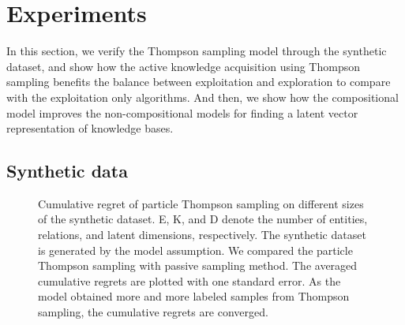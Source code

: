 \section{Experiments}
In this section, we verify the Thompson sampling model through the synthetic dataset, and show how 
the active knowledge acquisition using Thompson sampling benefits the balance between exploitation and exploration
 to compare with the exploitation only algorithms. And then, we show how the compositional model
improves the non-compositional models for finding a latent vector representation of knowledge bases.

\subsection{Synthetic data}
\begin{figure}[t]
	\centering
	
	\caption{\label{fig:synthetic} Cumulative regret of particle Thompson sampling on different sizes of the 
synthetic dataset. E, K, and D denote the number of entities, relations, and latent dimensions, respectively. 
The synthetic dataset is generated by the model assumption. We compared the particle Thompson sampling 
with passive sampling method. The averaged cumulative regrets are plotted with one standard error. As the 
model obtained more and more labeled samples from Thompson sampling, the cumulative regrets are 
converged. }
\end{figure}

